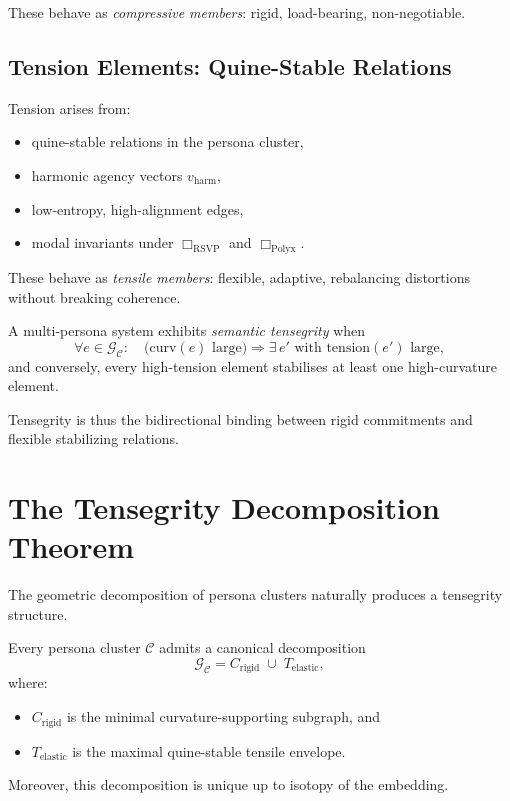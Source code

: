 These behave as \emph{compressive members}:
rigid, load-bearing, non-negotiable.


\subsection{Tension Elements: Quine-Stable Relations}

Tension arises from:

\begin{itemize}
    \item quine-stable relations in the persona cluster,
    \item harmonic agency vectors $v_{\mathrm{harm}}$,
    \item low-entropy, high-alignment edges,
    \item modal invariants under $\Box_{\mathrm{RSVP}}$ and $\Box_{\mathrm{Polyx}}$.
\end{itemize}

These behave as \emph{tensile members}:
flexible, adaptive, rebalancing distortions without breaking coherence.


\begin{definition}
A multi-persona system exhibits \emph{semantic tensegrity} when
\[
\forall e\in\mathcal{G}_{\mathcal{C}}:\quad
\bigl(\mathrm{curv}(e)\text{ large}\bigr)
\Longrightarrow
\exists\, e'
\text{ with }
\mathrm{tension}(e')\text{ large},
\]
and conversely, every high-tension element stabilises at least one
high-curvature element.
\end{definition}

Tensegrity is thus the bidirectional binding
between rigid commitments and flexible stabilizing relations.


\section{The Tensegrity Decomposition Theorem}

The geometric decomposition of persona clusters naturally produces a tensegrity structure.

\begin{theorem}
Every persona cluster $\mathcal{C}$ admits a canonical decomposition
\[
\mathcal{G}_{\mathcal{C}}
=
C_{\mathrm{rigid}}
\;\cup\;
T_{\mathrm{elastic}},
\]
where:
\begin{itemize}
    \item $C_{\mathrm{rigid}}$ is the minimal curvature-supporting subgraph, and
    \item $T_{\mathrm{elastic}}$ is the maximal quine-stable tensile envelope.
\end{itemize}
Moreover, this decomposition is unique up to isotopy of the embedding.
\end{theorem}

